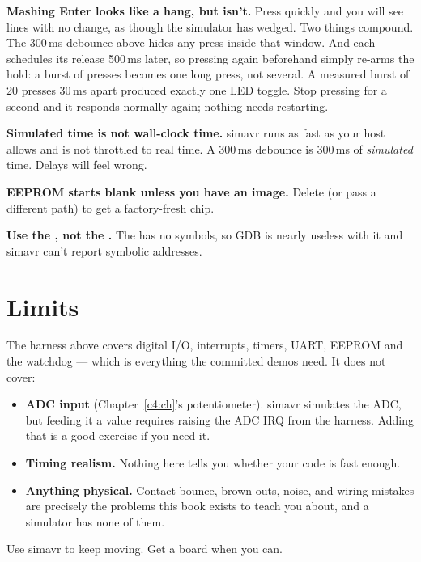 \textbf{Mashing Enter looks like a hang, but isn't.} Press quickly and you will see
 lines with no \code{[LED]} change, as though the simulator has wedged. Two things
compound. The 300\,ms debounce above hides any press inside that window. And each
 schedules its release 500\,ms later, so pressing again beforehand simply
re-arms the hold: a burst of presses becomes one long press, not several. A measured burst of 20
presses 30\,ms apart produced exactly one LED toggle. Stop pressing for a second and it responds
normally again; nothing needs restarting.

\textbf{Simulated time is not wall-clock time.} simavr runs as fast as your host allows and is not
throttled to real time. A 300\,ms debounce is 300\,ms of \emph{simulated} time. Delays will feel
wrong.

\textbf{EEPROM starts blank unless you have an image.} Delete  (or pass a
different  path) to get a factory-fresh chip.

\textbf{Use the , not the .} The  has no symbols, so GDB is nearly
useless with it and simavr can't report symbolic addresses.

\section{Limits}
\label{sim:sec:limits}
The harness above covers digital I/O, interrupts, timers, UART, EEPROM and the watchdog --- which
is everything the committed demos need. It does not cover:
\begin{itemize}
  \item \textbf{ADC input} (Chapter~\ref{c4:ch}'s potentiometer). simavr simulates the ADC, but
    feeding it a value requires raising the ADC IRQ from the harness. Adding that is a good
    exercise if you need it.
  \item \textbf{Timing realism.} Nothing here tells you whether your code is fast enough.
  \item \textbf{Anything physical.} Contact bounce, brown-outs, noise, and wiring mistakes are
    precisely the problems this book exists to teach you about, and a simulator has none of them.
\end{itemize}

Use simavr to keep moving. Get a board when you can.
